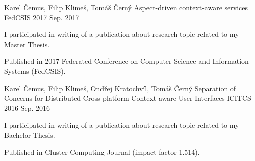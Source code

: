 \begin{cventries}
  \cventry
    {Karel Čemus, Filip Klimeš, Tomáš Černý}
    {Aspect-driven context-aware services}
    {FedCSIS 2017}
    {Sep. 2017}
    {
      \begin{cvitems}
        \item {I participated in writing of a publication about research topic related to my Master Thesis.}
        \item {Published in 2017 Federated Conference on Computer Science and Information Systems (FedCSIS).}
      \end{cvitems}
    }
  \cventry
    {Karel Čemus, Filip Klimeš, Ondřej Kratochvíl, Tomáš Černý}
    {Separation of Concerns for Distributed Cross-platform Context-aware User Interfaces}
    {ICITCS 2016}
    {Sep. 2016}
    {
      \begin{cvitems}
        \item {I participated in writing of a publication about research topic related to my Bachelor Thesis.}
        \item {Published in Cluster Computing Journal (impact factor 1.514).}
      \end{cvitems}
    }
\end{cventries}
